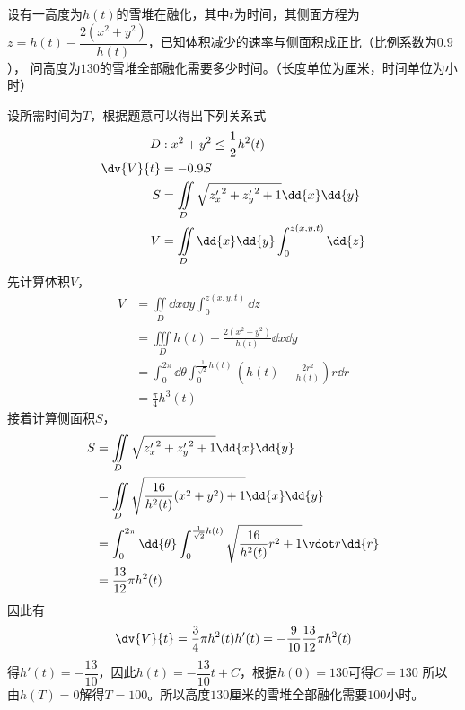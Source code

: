 \begin{example}
    设有一高度为$h(t)$的雪堆在融化，其中$t$为时间，其侧面方程为$z=h(t)-\dfrac{2(x^2+y^2)}{h(t)}$，已知体积减少的速率与侧面积成正比（比例系数为$0.9$），
    问高度为$130$的雪堆全部融化需要多少时间。（长度单位为厘米，时间单位为小时）
\end{example}
\begin{solution}
    设所需时间为$T$，根据题意可以得出下列关系式
    \begin{align*}
        D         & : x^2+y^2\leq \frac{1}{2}h^2(t)                             \\
        \dv{V}{t} & = -0.9S                                                     \\
        S         & = \iint\limits_D \sqrt{{z'_x}^2 + {z'_y}^2 + 1}\dd{x}\dd{y} \\
        V         & = \iint\limits_D \dd{x}\dd{y}\int_0^{z(x,y,t)} \dd{z}       \\
    \end{align*}
    先计算体积$V$，
    \begin{align*}
        V & = \iint\limits_D \dd{x}\dd{y}\int_0^{z(x,y,t)} \dd{z}                                                 \\
          & = \iiint\limits_D h(t)-\frac{2(x^2+y^2)}{h(t)}\dd{x}\dd{y}                                            \\
          & = \int_0^{2\pi} \dd{\theta}\int_0^{\frac{1}{\sqrt{2}}h(t)} \left(h(t)-\frac{2r^2}{h(t)}\right)r\dd{r} \\
          & = \frac{\pi}{4}h^3(t)
    \end{align*}
    接着计算侧面积$S$，
    \begin{align*}
        S & = \iint\limits_D \sqrt{{z'_x}^2 + {z'_y}^2 + 1}\dd{x}\dd{y}                                               \\
          & = \iint\limits_D \sqrt{\frac{16}{h^2(t)}(x^2+y^2) + 1} \dd{x}\dd{y}                                       \\
          & = \int_0^{2\pi} \dd{\theta} \int_0^{\frac{1}{\sqrt{2}}h(t)} \sqrt{\frac{16}{h^2(t)}r^2 + 1} \vdot r\dd{r} \\
          & = \frac{13}{12}\pi h^2(t)
    \end{align*}
    因此有
    \[ \dv{V}{t} = \frac{3}{4}\pi h^2(t) h'(t) = -\frac{9}{10} \frac{13}{12}\pi h^2(t) \]
    得$h'(t) = -\dfrac{13}{10}$，因此$h(t)=-\dfrac{13}{10}t + C$，根据$h(0)=130$可得$C=130$
    所以由$h(T)=0$解得$T=100$。所以高度$130$厘米的雪堆全部融化需要$100$小时。
\end{solution}

